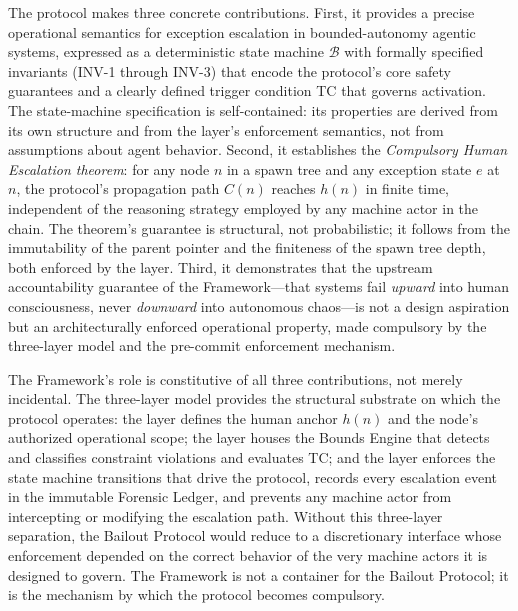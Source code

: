 The protocol makes three concrete contributions. First, it provides a precise operational semantics for exception escalation in bounded-autonomy agentic systems, expressed as a deterministic state machine $\mathcal{B}$ with formally specified invariants (INV-1 through INV-3) that encode the protocol's core safety guarantees and a clearly defined trigger condition TC that governs activation. The state-machine specification is self-contained: its properties are derived from its own structure and from the \fact{} layer's enforcement semantics, not from assumptions about agent behavior. Second, it establishes the \textit{Compulsory Human Escalation theorem}: for any node $n$ in a \bxthree{} spawn tree and any exception state $e$ at $n$, the protocol's propagation path $C(n)$ reaches $h(n)$ in finite time, independent of the reasoning strategy employed by any machine actor in the chain. The theorem's guarantee is structural, not probabilistic; it follows from the immutability of the parent pointer and the finiteness of the spawn tree depth, both enforced by the \fact{} layer. Third, it demonstrates that the upstream accountability guarantee of the \bxthree{} Framework---that systems fail \emph{upward} into human consciousness, never \emph{downward} into autonomous chaos---is not a design aspiration but an architecturally enforced operational property, made compulsory by the three-layer model and the pre-commit enforcement mechanism.

The \bxthree{} Framework's role is constitutive of all three contributions, not merely incidental. The three-layer model provides the structural substrate on which the protocol operates: the \purpose{} layer defines the human anchor $h(n)$ and the node's authorized operational scope; the \bounds{} layer houses the Bounds Engine that detects and classifies constraint violations and evaluates TC; and the \fact{} layer enforces the state machine transitions that drive the protocol, records every escalation event in the immutable Forensic Ledger, and prevents any machine actor from intercepting or modifying the escalation path. Without this three-layer separation, the Bailout Protocol would reduce to a discretionary interface whose enforcement depended on the correct behavior of the very machine actors it is designed to govern. The \bxthree{} Framework is not a container for the Bailout Protocol; it is the mechanism by which the protocol becomes compulsory.

